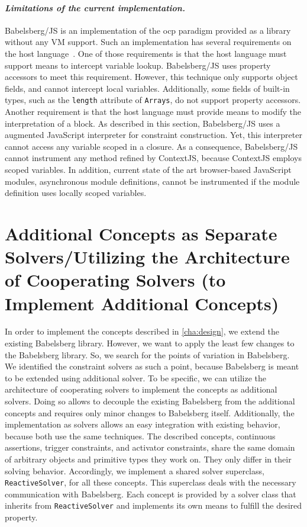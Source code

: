 \paragraph{\emph{Limitations of the current implementation.}}
Babelsberg/JS is an implementation of the \gls{ocp} paradigm provided as a library without any VM support. Such an implementation has several requirements on the host language~\cite{Felgentreff:2014:babelsbergjs}. One of those requirements is that the host language must support means to intercept variable lookup. Babelsberg/JS uses property accessors to meet this requirement. However, this technique only supports object fields, and cannot intercept local variables. Additionally, some fields of built-in types, such as the \texttt{length} attribute of \texttt{Arrays}, do not support property accessors.
Another requirement is that the host language must provide means to modify the interpretation of a block.
As described in this section, Babelsberg/JS uses a augmented JavaScript interpreter for constraint construction.
Yet, this interpreter cannot access any variable scoped in a closure. 
As a consequence, Babelsberg/JS cannot instrument any method refined by ContextJS, because ContextJS employs scoped variables. In addition, current state of the art browser-based JavaScript modules, asynchronous module definitions, cannot be instrumented if the module definition uses locally scoped variables.

\section{Additional Concepts as Separate Solvers/Utilizing the Architecture of Cooperating Solvers (to Implement Additional Concepts)}
In order to implement the concepts described in \autoref{cha:design}, we extend the existing Babelsberg library.
However, we want to apply the least few changes to the Babelsberg library.
So, we search for the points of variation in Babelsberg. We identified the constraint solvers as such a point, because Babelsberg is meant to be extended using additional solver.
To be specific, we can utilize the architecture of cooperating solvers to implement the concepts as additional solvers.
Doing so allows to decouple the existing Babelsberg from the additional concepts and requires only minor changes to Babelsberg itself. Additionally, the implementation as solvers allows an easy integration with existing behavior, because both use the same techniques.
%
The described concepts, continuous assertions, trigger constraints, and activator constraints, share the same domain of arbitrary objects and primitive types they work on. They only differ in their solving behavior.
Accordingly, we implement a shared solver superclass, \texttt{ReactiveSolver}, for all these concepts. This superclass deals with the necessary communication with Babelsberg. Each concept is provided by a solver class that inherits from \texttt{ReactiveSolver} and implements its own means to fulfill the desired property.

